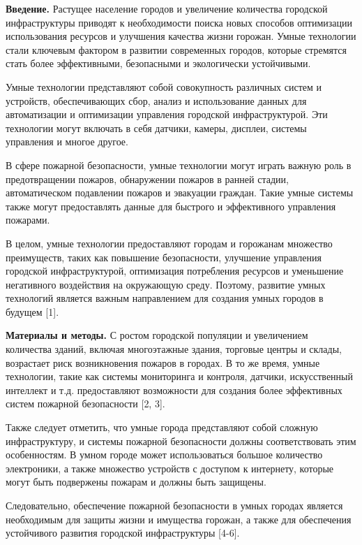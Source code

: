 \begin{multicols}{2}
{\bfseries Введение.} Растущее население городов и увеличение количества
городской инфраструктуры приводят к необходимости поиска новых способов
оптимизации использования ресурсов и улучшения качества жизни горожан.
Умные технологии стали ключевым фактором в развитии современных городов,
которые стремятся стать более эффективными, безопасными и экологически
устойчивыми.

Умные технологии представляют собой совокупность различных систем и
устройств, обеспечивающих сбор, анализ и использование данных для
автоматизации и оптимизации управления городской инфраструктурой. Эти
технологии могут включать в себя датчики, камеры, дисплеи, системы
управления и многое другое.

В сфере пожарной безопасности, умные технологии могут играть важную роль
в предотвращении пожаров, обнаружении пожаров в ранней стадии,
автоматическом подавлении пожаров и эвакуации граждан. Такие умные
системы также могут предоставлять данные для быстрого и эффективного
управления пожарами.

В целом, умные технологии предоставляют городам и горожанам множество
преимуществ, таких как повышение безопасности, улучшение управления
городской инфраструктурой, оптимизация потребления ресурсов и уменьшение
негативного воздействия на окружающую среду. Поэтому, развитие умных
технологий является важным направлением для создания умных городов в
будущем {[}1{]}.

{\bfseries Материалы и методы.} С ростом городской популяции и увеличением
количества зданий, включая многоэтажные здания, торговые центры и
склады, возрастает риск возникновения пожаров в городах. В то же время,
умные технологии, такие как системы мониторинга и контроля, датчики,
искусственный интеллект и т.д. предоставляют возможности для создания
более эффективных систем пожарной безопасности {[}2, 3{]}.

Также следует отметить, что умные города представляют собой сложную
инфраструктуру, и системы пожарной безопасности должны соответствовать
этим особенностям. В умном городе может использоваться большое
количество электроники, а также множество устройств с доступом к
интернету, которые могут быть подвержены пожарам и должны быть защищены.

Следовательно, обеспечение пожарной безопасности в умных городах
является необходимым для защиты жизни и имущества горожан, а также для
обеспечения устойчивого развития городской инфраструктуры {[}4-6{]}.


\end{multicols}
